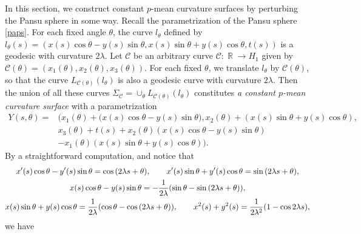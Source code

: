 \documentclass[10pt,a4paper]{amsart}
\numberwithin{equation}{section}
\DeclareMathOperator{\R}{\mathbb R}
\begin{document}
In this section, we construct constant $p$-mean curvature
surfaces by perturbing the Pansu sphere in some way. Recall the
parametrization of the Pansu sphere \eqref{paps}. For each fixed angle $
\theta$, the curve $l_{\theta}$ defined by $l_{\theta}(s)=(x(s)\cos{\theta}
-y(s)\sin{\theta},x(s)\sin{\theta}+y(s)\cos{\theta},t(s))$ is a geodesic
with curvature $2\lambda$. Let $\mathcal{C}$ be an arbitrary curve $\mathcal{
C}\colon\R \rightarrow H_{1}$ given by $\mathcal{C}(\theta)=(x_{1}(\theta),x_{2}(
\theta),x_{3}(\theta))$. For each fixed $\theta$, we translate $l_{\theta}$
by $\mathcal{C}(\theta)$, so that the curve $L_{\mathcal{C}
(\theta)}(l_{\theta})$ is also a geodesic curve with curvature $2\lambda$.
Then the union of all these curves
$
\Sigma_{\mathcal{C}}=\cup_{\theta}L_{\mathcal{C}(\theta)}(l_{\theta})
$
constitutes \emph{a constant $p$-mean curvature surface} with a
parametrization
\begin{align}
Y(s,\theta)={}&(x_{1}(\theta)+(x(s)\cos{\theta}-y(s)\sin{\theta}\bigr)
,x_{2}(\theta)+(x(s)\sin{\theta}+y(s)\cos{\theta}),\nonumber \\
&x_{3}(\theta)+t(s)+x_{2}(\theta)(x(s)\cos{\theta}-y(s)\sin{\theta})\nonumber\\
&-x_{1}(\theta)(x(s)\sin{\theta}+y(s)\cos{\theta})).\label{pacms}
\end{align}
By a straightforward computation, and notice that
\begin{gather*}
x^{\prime }(s)\cos{\theta}-y^{\prime }(s)\sin{\theta}=\cos{(2\lambda
s+\theta)}, \qquad
x^{\prime }(s)\sin{\theta}+y^{\prime }(s)\cos{\theta}=\sin{(2\lambda
s+\theta)}, \\
x(s)\cos{\theta}-y(s)\sin{\theta}=-\frac{1}{2\lambda}(\sin{\theta}-\sin{%
(2\lambda s+\theta)}), \\
x(s)\sin{\theta}+y(s)\cos{\theta}=\frac{1}{2\lambda}(\cos{\theta}-\cos{%
(2\lambda s+\theta)}), \qquad
x^2(s)+y^2(s)=\frac{1}{2\lambda^2}(1-\cos{2\lambda s}),
\end{gather*}
we have
\end{document}
